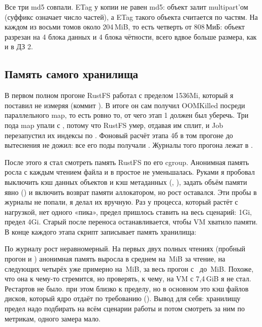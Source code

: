 Все три md5 совпали. ETag у копии не равен md5: объект залит multipart'ом (суффикс  означает число частей), а ETag такого объекта считается по частям. На каждом из восьми томов около 204\,MiB, то есть четверть от 808\,МиБ: объект разрезан на 4 блока данных и 4 блока чётности, всего вдвое больше размера, как и в ДЗ 2.


\subsection{Память самого хранилища}\label{sec:rustfs-mem}
В первом полном прогоне RustFS работал с пределом 1536Mi, который я поставил не измеряя (коммит ). В итоге он сам получил OOMKilled посреди параллельного map, то есть ровно то, от чего этап 1 должен был уберечь. Три пода map упали с , потому что RustFS умер, отдавая им сплит, и Job перезапустил их индексы по . Фоновый расчёт этапа 4б в том прогоне до вытеснения не дожил: все его поды получали . Журналы того прогона лежат в .


После этого я стал смотреть память RustFS по его cgroup. Анонимная память росла с каждым чтением файла и в простое не уменьшалась. Руками я пробовал выключить кэш данных объектов и кэш метаданных (, ), задать объём памяти явно () и включить возврат памяти аллокатором, но рост оставался. Эти пробы в журналы не попали, я делал их вручную. Раз у процесса, который растёт с нагрузкой, нет одного «пика», предел пришлось ставить на весь сценарий:  1Gi, предел 4Gi. Старый  после переноса останавливается, чтобы VM хватило памяти. В конце каждого этапа скрипт записывает память хранилища:


По журналу рост неравномерный. На первых двух полных чтениях (пробный прогон и ) анонимная память выросла в среднем на \rfsGrowFirst\,MiB за чтение, на следующих четырёх уже примерно на \rfsGrowLater\,MiB, за весь прогон с \rfsAnonStart\ до \rfsAnonEnd\,MiB. Похоже, что она к чему-то стремится, но проверять, к чему, на VM с 7,4\,GiB я не стал. Рестартов не было.  при этом близко к пределу, но в основном это кэш файлов дисков, который ядро отдаёт по требованию (). Вывод для себя: хранилищу предел надо подбирать на всём сценарии работы и потом смотреть за ним по метрикам, одного замера мало.


